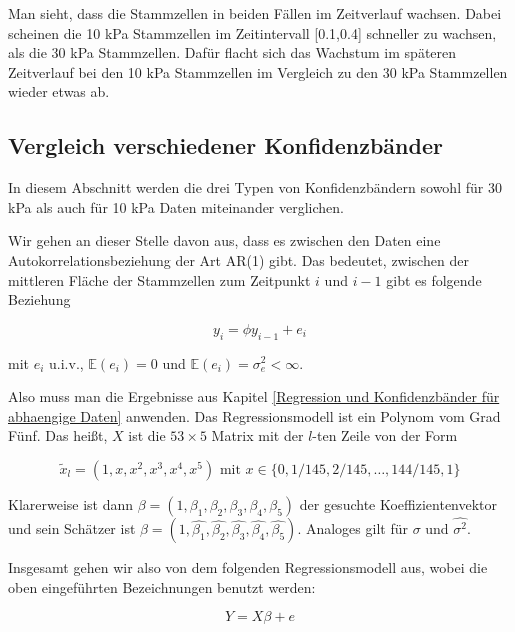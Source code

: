 \documentclass[12pt,a4paper]{article}
\theoremstyle{definition}
\theoremstyle{definition}
\theoremstyle{definition}
\theoremstyle{definition}
\begin{document}
Man sieht, dass die Stammzellen in beiden Fällen im Zeitverlauf wachsen. Dabei scheinen die 10 kPa Stammzellen im Zeitintervall [0.1,0.4] schneller zu wachsen, als die 30 kPa Stammzellen. Dafür flacht sich das Wachstum im späteren Zeitverlauf bei den 10 kPa Stammzellen im Vergleich zu den 30 kPa Stammzellen wieder etwas ab.



\subsection{Vergleich verschiedener Konfidenzbänder}
\label{Vergleich verschiedener Konfidenzbänder}
In diesem Abschnitt werden die drei Typen von Konfidenzbändern sowohl für 30 kPa als auch für 10 kPa Daten miteinander verglichen. 

Wir gehen an dieser Stelle davon aus, dass es zwischen den Daten eine Autokorrelationsbeziehung der Art AR(1) gibt. Das bedeutet, zwischen der mittleren Fläche der Stammzellen zum Zeitpunkt $i$ und $i-1$ gibt es folgende Beziehung

\begin{equation*}
y_i = \phi y_{i-1} + e_i
\end{equation*}

mit $e_i$ u.i.v., $\mathbb{E}(e_i)=0$ und $\mathbb{E}(e_i) = \sigma_e^2 < \infty$.

Also muss man die Ergebnisse aus Kapitel \ref{Regression und Konfidenzbänder für abhaengige Daten} anwenden. Das Regressionsmodell ist ein Polynom vom Grad Fünf. Das heißt, $X$ ist die $53 \times 5$ Matrix mit der $l$-ten Zeile von der Form 

\begin{equation*}
\tilde{x}_l = (1, x, x^2, x^3, x^4, x^5 ) \text{ mit } x \in \{0, 1/145, 2/145, \ldots, 144/145, 1 \}
\end{equation*}

Klarerweise ist dann $\beta = (1, \beta_1, \beta_2, \beta_3, \beta_4, \beta_5)$ der gesuchte Koeffizientenvektor und sein Schätzer ist $\hat{\beta} = (1, \hat{\beta_1}, \hat{\beta_2}, \hat{\beta_3}, \hat{\beta_4}, \hat{\beta_5})$. Analoges gilt für $\sigma$ und $\widehat{\sigma^2}$.

Insgesamt gehen wir also von dem folgenden Regressionsmodell aus, wobei die oben eingeführten Bezeichnungen benutzt werden:

\begin{equation*}
Y = X \beta + e
\end{equation*}
\end{document}
